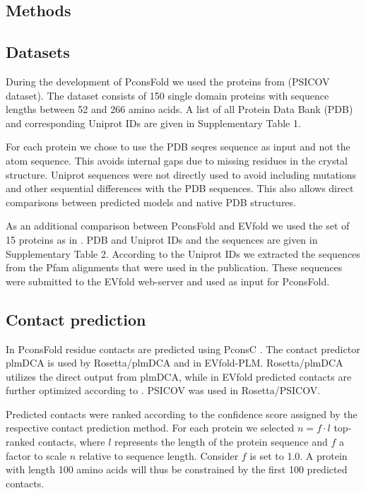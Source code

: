 \documentclass{bioinfo}
\begin{document}
\begin{methods}
\section{Methods}

\subsection{Datasets}
During the development of PconsFold we used the proteins from
\citeauthor{jones_psicov:_2012} \citeyear{jones_psicov:_2012} (PSICOV
dataset). The dataset consists of 150 single domain proteins with sequence
lengths between 52 and 266 amino acids. A list of all Protein Data
Bank (PDB) \cite[]{berman_protein_2000} and corresponding Uniprot
\cite[]{magrane_uniprot_2011} IDs are given in Supplementary Table
1. 


For each protein we chose to use the PDB seqres sequence as input and
not the atom sequence. This avoids internal gaps due to missing
residues in the crystal structure.  Uniprot sequences were not
directly used to avoid including mutations and other sequential
differences with the PDB sequences. This also allows direct
comparisons between predicted models and native PDB structures. 

As an additional comparison between PconsFold and EVfold we used the set
of 15 proteins as in \cite{marks_protein_2011}. PDB and Uniprot IDs and the sequences are given in
Supplementary Table 2. According to the Uniprot IDs we extracted the sequences from the
Pfam alignments that were used in the publication. These sequences were
submitted to the EVfold web-server and used as input for PconsFold.

\subsection{Contact prediction}
In PconsFold residue contacts are predicted using
PconsC \cite[]{skwark_PconsC:_2013}. The contact predictor
plmDCA \cite[]{ekeberg_improved_2013} is used by Rosetta/plmDCA and in
EVfold-PLM. Rosetta/plmDCA utilizes the direct output from plmDCA,
while in EVfold predicted contacts are further optimized according to
\cite{marks_protein_2011}. PSICOV \cite[]{jones_psicov:_2012} was used
in Rosetta/PSICOV.


Predicted contacts were ranked according to the confidence score
assigned by the respective contact prediction method. For each protein
we selected $n = f \cdot l$ top-ranked contacts, where $l$ represents
the length of the protein sequence and $f$ a factor to scale $n$
relative to sequence length. {\color{red} Consider $f$ is set to 1.0.
A protein with length 100 amino acids will thus be constrained by the
first 100 predicted contacts.}




\end{methods}
\end{document}
